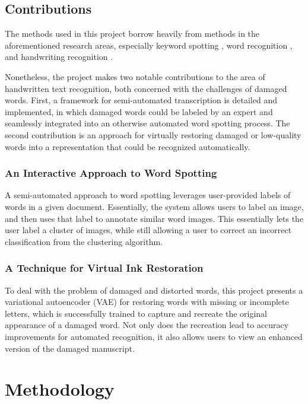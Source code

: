 \documentclass[final]{ukthesis}
\begin{document}
%
%
\section{Contributions}
The methods used in this project borrow heavily from methods in the aforementioned research areas, especially keyword spotting \cite{sharma2015adapting,frinken2012novel}, word recognition \cite{howe2009finding}, and handwriting recognition \cite{fischer2013fast,bluche2013feature}.

Nonetheless, the project makes two notable contributions to the area of handwritten text recognition, both concerned with the challenges of damaged words. First, a framework for semi-automated transcription is detailed and implemented, in which damaged words could be labeled by an expert and seamlessly integrated into an otherwise automated word spotting process. The second contribution is an approach for virtually restoring damaged or low-quality words into a representation that could be recognized automatically.


\subsection{An Interactive Approach to Word Spotting}
A semi-automated approach to word spotting leverages user-provided labels of words in a given document. Essentially, the system allows users to label an image, and then uses that label to annotate similar word images. This essentially lets the user label a cluster of images, while still allowing a user to correct an incorrect classification from the clustering algorithm.


\subsection{A Technique for Virtual Ink Restoration}
To deal with the problem of damaged and distorted words, this project presents a variational autoencoder (VAE) for restoring words with missing or incomplete letters, which is successfully trained to capture and recreate the  original appearance of a damaged word. Not only does the recreation lead to accuracy improvements for automated recognition, it also allows users to view an enhanced version of the damaged manuscript.




%
%
%
\chapter{Methodology}
\end{document}
